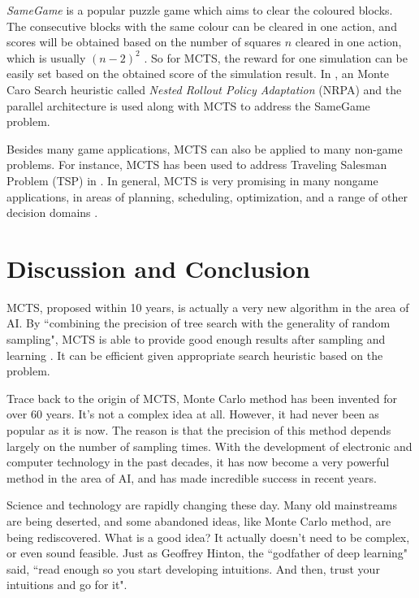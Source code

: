 \documentclass[a4paper,12pt]{article}
\begin{document}
\textit{SameGame} is a popular puzzle game
which aims to clear the coloured blocks. The consecutive blocks with the same colour can be cleared in one action, and
scores will be obtained based on the number of squares $n$ cleared in one action, which is usually $(n-2)^2$ \cite{case5}. So for MCTS, the reward for one simulation can be easily set based on the obtained score of the simulation result.
In \cite{case5}, an Monte Caro Search heuristic called \textit{Nested Rollout Policy Adaptation} (NRPA) and the parallel architecture is used along with MCTS to address the SameGame problem. 

Besides many game applications, MCTS can also be applied to many non-game problems. For instance,
MCTS has been used to address Traveling Salesman Problem (TSP) in \cite{case6}. 
In general, MCTS is very promising in many
nongame applications, in areas of planning, scheduling, optimization,
and a range of other decision domains \cite{case2}.






\section{Discussion and Conclusion}

MCTS, proposed within 10 years, is actually a very new algorithm in the area of AI. By ``combining the precision of tree search with the generality
of random sampling", MCTS is able to provide good enough results after sampling and learning \cite{case2}. It can be efficient given appropriate search heuristic based on the problem. 

Trace back to the origin of MCTS, Monte Carlo method has been invented for over 60 years. It's not a complex idea at all.
However, it had never been as popular as it is now. The reason is that the precision of this method depends largely on the number of sampling times. 
With the development of electronic and computer technology in the past decades, it has now become a very powerful method in the area of AI, and has made incredible success in recent years. 

Science and technology are rapidly changing these day. Many old mainstreams are being deserted, and some abandoned ideas, like Monte Carlo method, are being rediscovered. What is a good idea? It actually doesn't need to be complex, or even sound feasible. Just as Geoffrey Hinton, the ``godfather of deep learning" said, ``read enough so you start developing intuitions. And then, trust your intuitions and go for it"\cite{case7}.
\end{document}
